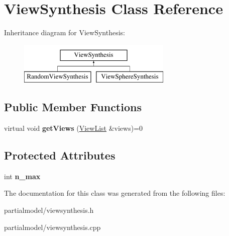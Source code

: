 \hypertarget{classViewSynthesis}{}\section{View\+Synthesis Class Reference}
\label{classViewSynthesis}
Inheritance diagram for View\+Synthesis\+:\begin{figure}[H]
\begin{center}
\leavevmode
\includegraphics[height=2.000000cm]{classViewSynthesis}
\end{center}
\end{figure}
\subsection*{Public Member Functions}
\begin{DoxyCompactItemize}
\item 
virtual void {\bfseries get\+Views} (\hyperlink{classViewList}{View\+List} \&views)=0\hypertarget{classViewSynthesis_af824834c692508e903544c45c18fd4ed}{}\label{classViewSynthesis_af824834c692508e903544c45c18fd4ed}

\end{DoxyCompactItemize}
\subsection*{Protected Attributes}
\begin{DoxyCompactItemize}
\item 
int {\bfseries n\+\_\+max}\hypertarget{classViewSynthesis_a8afd651580422c328f593cf8e5a6aaf1}{}\label{classViewSynthesis_a8afd651580422c328f593cf8e5a6aaf1}

\end{DoxyCompactItemize}


The documentation for this class was generated from the following files\+:\begin{DoxyCompactItemize}
\item 
partialmodel/viewsynthesis.\+h\item 
partialmodel/viewsynthesis.\+cpp\end{DoxyCompactItemize}
